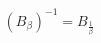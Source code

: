 \documentclass[preview]{standalone}
\begin{document}
\begin{align*}
(B_{\beta})^{-1} =  B_{\frac{1}{\beta}}
\end{align*}
\end{document}
